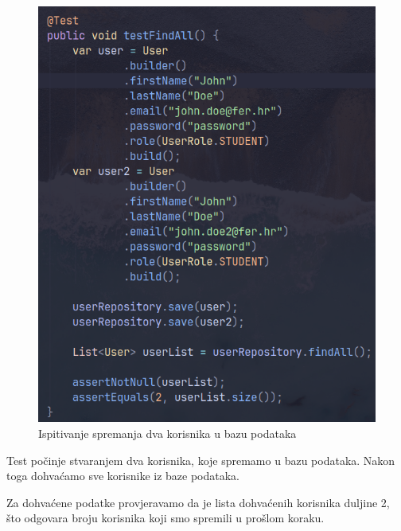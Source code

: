 \begin{figure}[H]
	\includegraphics[scale=0.6]{slike/test_2.png}
	\centering
	\caption{Ispitivanje spremanja dva korisnika u bazu podataka}
	\label{fig:test_2}
\end{figure}

Test počinje stvaranjem dva korisnika, koje spremamo u bazu podataka. Nakon 
toga dohvaćamo sve korisnike iz baze podataka.

Za dohvaćene podatke provjeravamo da je lista dohvaćenih korisnika duljine 2, 
što odgovara broju korisnika koji smo spremili u prošlom koraku.

